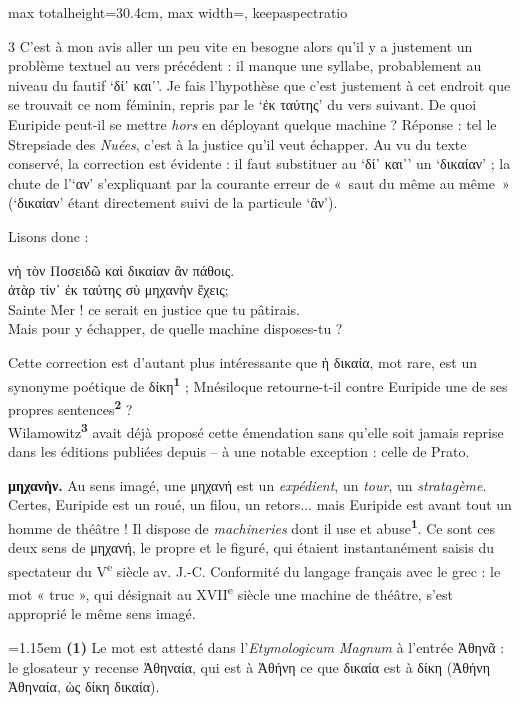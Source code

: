 \documentclass[11pt,twoside]{book}
\newcommand{\italique}[1]{\textit{#1}}
\newcommand{\citComm}[1]{\begin{quoting}[vskip=0.4pt,leftmargin=0.7em,rightmargin=0.2em]#1\end{quoting}}
\newcommand{\nieme}[1]{#1\textsuperscript{e}}
\newcommand{\EtymMagnum}{\textit{Etymologicum Magnum} }
\newcommand{\francais}[1]{{\policeFr #1}}
\newcommand{\marqueur}[1]{\textsuperscript{\color{rubricRed}\textbf{#1}}}
\begin{document}
\begin{adjustbox}{max totalheight=30.4cm, max width=\textwidth, keepaspectratio}
\begin{minipage}{\textwidth}
{\begin{multicols}{3}
\noindent C'est à mon avis aller un peu vite en besogne alors qu'il y a justement un problème textuel au vers précédent : il manque une syllabe, probablement au niveau du fautif `δί᾽ και᾽'. Je fais l'hypothèse que c'est justement à cet endroit que se trouvait ce nom féminin, repris par le `ἐκ ταύτης' du vers suivant. De quoi Euripide peut-il se mettre \italique{hors} en déployant quelque machine ? Réponse : tel le Strepsiade des \italique{Nuées}, c'est à la justice qu'il veut échapper. Au vu du texte conservé, la correction est évidente : il faut substituer au `δί᾽ και᾽' un `δικαίαν' ; la chute de l'`αν' s'expliquant par la courante erreur de «~saut du même au même~» (`δικαίαν' étant directement suivi de la particule `ἂν').
\par\vspace{1.5pt}
\noindent Lisons donc :
\citComm{νὴ τὸν Ποσειδῶ καὶ δικαίαν ἂν πάθοις.\\
ἀτὰρ τίν᾽ ἐκ ταύτης σὺ μηχανὴν ἔχεις;\\
\francais{Sainte Mer ! ce serait en justice que tu pâtirais.\\
Mais pour y échapper, de quelle machine disposes-tu ?}}
\par\vspace{1.5pt}
\noindent Cette correction est d'autant plus intéressante que ἡ δικαία, mot rare, est un synonyme poétique de δίκη\marqueur{1} ; Mnésiloque retourne-t-il contre Euripide une de ses propres sentences\marqueur{2} ?\\ Wilamowitz\marqueur{3} avait déjà proposé cette émendation sans qu'elle soit jamais reprise dans les éditions publiées depuis -- à une notable exception : celle de Prato.
\par\vspace{1.5pt}
 \textbf{μηχανὴν.} Au sens imagé, une μηχανή est un \italique{expédient}, un \italique{tour}, un \italique{stratagème}. Certes, Euripide est un roué, un filou, un retors... mais Euripide est avant tout un homme de théâtre ! Il dispose de \italique{machineries} dont il use et abuse\marqueur{1}. Ce sont ces deux sens de μηχανή, le propre et le figuré, qui étaient instantanément saisis du spectateur du \nieme{V} siècle av. J.-C. Conformité du langage français avec le grec : le mot « truc », qui désignait au \nieme{XVII} siècle une machine de théâtre, s'est approprié le même sens imagé.
\par\vspace{1.5pt}
\par\vspace{1.2pt}\par\nopagebreak\vspace{1pt}\noindent\hangindent=1.15em {\color{sepiaNote}\textbf{(1)}} Le mot est attesté dans l'\EtymMagnum à l'entrée Ἀθηνᾶ : le glosateur y recense Ἀθηναία, qui est à Ἀθήνη ce que δικαία est à δίκη (Ἀθήνη Ἀθηναία, ὡς δίκη δικαία).

\end{multicols}}
\end{minipage}
\end{adjustbox}
\end{document}

